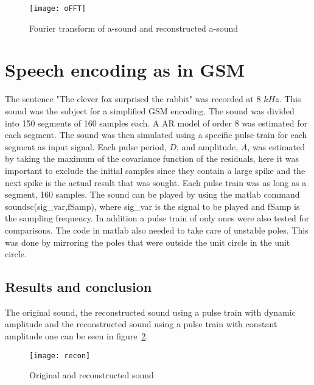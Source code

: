 \documentclass[10pt]{article}
\begin{document}
\begin{figure}[!hp]

    \begin{center}
      \texttt{[image: oFFT]}
    \caption{Fourier transform of a-sound and reconstructed a-sound \label{fig:ffta}}
    \end{center}

\end{figure}

\clearpage


\section{Speech encoding as in GSM}
The sentence "The clever fox surprised the rabbit" was recorded at
8 $kHz$. This sound was the subject for a simplified GSM encoding.
The sound was divided into 150 segments of 160 samples each. A
AR model of order 8 was estimated for each segment. The sound was
then simulated using a specific pulse train for each segment as
input signal. Each pulse period, $D$, and amplitude, $A$, was
estimated by taking the maximum of the covariance function of the
residuals, here it was important to exclude the initial samples since they contain
a large spike and the next spike is the actual result that was sought.
Each pulse train was as long as a segment, 160 samples.
The sound can be played by using the matlab command soundsc(sig_var,fSamp),
where sig_var is the signal to be played and fSamp is the sampling frequency.
In addition a pulse train of only ones were also tested for comparisons.
The code in matlab also needed to take care of unstable poles. This was done by
mirroring the poles that were outside the unit circle in the unit circle.



\subsection{Results and conclusion}
The original sound, the reconstructed sound using a pulse train with
dynamic amplitude and the reconstructed sound using a pulse train
with constant amplitude one can be seen in figure~\ref{fig:recon}.

\begin{figure}[!hp]

    \begin{center}
      \texttt{[image: recon]}
    \caption{Original and reconstructed sound\label{fig:recon}}
    \end{center}

\end{figure}
\end{document}
